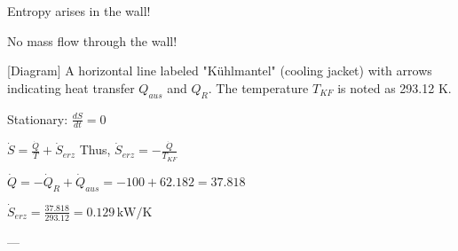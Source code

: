 Entropy arises in the wall!  

No mass flow through the wall!  

[Diagram]  
A horizontal line labeled "Kühlmantel" (cooling jacket) with arrows indicating heat transfer \( Q_{aus} \) and \( Q_R \). The temperature \( T_{KF} \) is noted as 293.12 K.  

Stationary: \( \frac{dS}{dt} = 0 \)  

\( \dot{S} = \frac{\dot{Q}}{T} + \dot{S}_{erz} \)  
Thus, \( \dot{S}_{erz} = -\frac{\dot{Q}}{T_{KF}} \)  

\( \dot{Q} = -\dot{Q}_R + \dot{Q}_{aus} = -100 + 62.182 = 37.818 \)  

\( \dot{S}_{erz} = \frac{37.818}{293.12} = 0.129 \, \text{kW/K} \)  

---